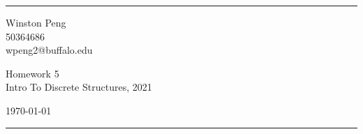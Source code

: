 \documentclass[a4paper]{article}
\begin{document}

\fancyhead[C]{}
\hrule \medskip %
\begin{minipage}{0.295\textwidth} 
\raggedright
\footnotesize
Winston Peng \hfill\\   
50364686 \hfill\\
wpeng2@buffalo.edu
\end{minipage}
\begin{minipage}{0.4\textwidth} 
\centering 
\large 
Homework 5\\ 
\normalsize 
Intro To Discrete Structures, 2021\\ 
\end{minipage}
\begin{minipage}{0.295\textwidth} 
\raggedleft
\today\hfill\\
\end{minipage}
\medskip\hrule 
\bigskip
\end{document}
